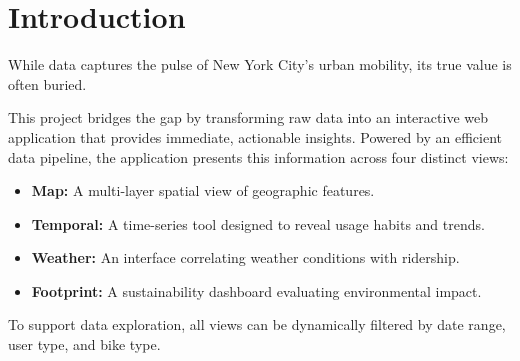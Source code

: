 \section{Introduction}\label{sec:introduction}
While  data captures the pulse of New York City's urban mobility, its true value is often buried.

This project bridges the gap by transforming raw data into an interactive web application that provides immediate, actionable insights. 
Powered by an efficient data pipeline, the application presents this information across four distinct views:
\begin{itemize}
    \item \textbf{Map:} A multi-layer spatial view of geographic features.
    \item \textbf{Temporal:} A time-series tool designed to reveal usage habits and trends.
    \item \textbf{Weather:} An interface correlating weather conditions with ridership.
    \item \textbf{Footprint:} A sustainability dashboard evaluating environmental impact.
\end{itemize}
To support data exploration, all views can be dynamically filtered by date range, user type, and bike type.